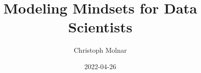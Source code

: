 \documentclass[
  10pt,
]{scrbook}
\title{Modeling Mindsets for Data Scientists}
\author{Christoph Molnar}
\date{2022-04-26}
\begin{document}
\maketitle

\thispagestyle{empty}

\end{document}
